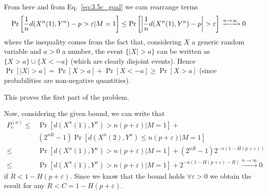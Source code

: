 From here and from Eq.~\eqref{eq:3.5c_goal} we cam rearrange terms
%
\begin{equation}
\Pr \qty[ \frac{1}{n} d(X^n(1),Y^n) - p > \varepsilon |M=1] \leq \Pr \qty[ \qty| \frac{1}{n} d(X^n(1),Y^n) - p| > \varepsilon] \xrightarrow{n\rightarrow \infty} 0
\end{equation}
%
where the inequality comes from the fact that, considering $X$ a generic random variable and $a>0$ a number, the event $\{|X|>a\}$ can be written as $\{X>a\} \cup \{X<-a\}$ (which are clearly disjoint events). Hence $\Pr[|X|>a] = \Pr[X>a] + \Pr[X<-a] \geq \Pr[X>a]$ (since probabilities are non-negative quantities).

This proves the first part of the problem.

Now, considering the given bound, we can write that
%
\begin{equation}
\begin{split}
P_e^{(n)} \leq& \Pr[d(X^n(1),Y^n)>n(p+\varepsilon) | M=1] +\\
	&(2^{nR}-1) \Pr[d(X^n(2),Y^n) \leq n(p+\varepsilon) | M=1] \\
\leq& \Pr[d(X^n(1),Y^n)>n(p+\varepsilon) | M=1] + (2^{nR}-1)2^{-n(1-H(p+\varepsilon))}\\
\leq& \Pr[d(X^n(1),Y^n)>n(p+\varepsilon) | M=1] + 2^{-n(1-H(p+\varepsilon)-R)}
\xrightarrow{n\rightarrow \infty} 0
\end{split}
\end{equation}
%
if $R<1-H(p+\varepsilon)$. Since we know that the bound holds $\forall \varepsilon>0$ we obtain the result for any $R<C=1-H(p+\varepsilon)$.

